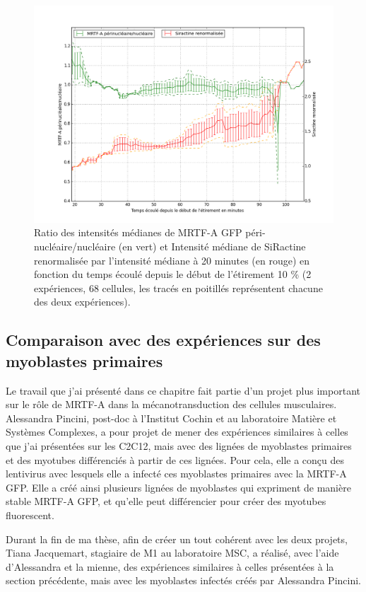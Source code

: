 \begin{figure}
\includegraphics[scale=0.4]{Figures/C2C12.png} 
\caption{Ratio des intensités médianes de MRTF-A GFP péri-nucléaire/nucléaire (en vert) et Intensité médiane de SiRactine renormalisée par l'intensité médiane à 20 minutes (en rouge)  en fonction du temps écoulé depuis le début de l'étirement 10 \% (2 expériences, 68 cellules, les tracés en poitillés représentent chacune des deux expériences).\label{Siractine_quantif}}
\end{figure}
 


\subsection{Comparaison avec des expériences sur des myoblastes primaires}

Le travail que j'ai présenté dans ce chapitre fait partie d'un projet plus important sur le rôle de MRTF-A dans la mécanotransduction des cellules musculaires. Alessandra Pincini, post-doc à l'Institut Cochin et au laboratoire Matière et Systèmes Complexes, a pour projet de mener des expériences similaires à celles que j'ai présentées sur les C2C12, mais avec des lignées de myoblastes primaires et des myotubes différenciés à partir de ces lignées. Pour cela, elle a conçu des lentivirus avec lesquels elle a infecté ces myoblastes primaires avec la MRTF-A GFP. Elle a créé ainsi plusieurs lignées de myoblastes qui expriment de manière stable MRTF-A GFP, et qu'elle peut différencier pour créer des myotubes fluorescent. 

Durant la fin de ma thèse, afin de créer un tout cohérent avec les deux projets, Tiana Jacquemart, stagiaire de M1 au laboratoire MSC, a réalisé, avec l'aide d'Alessandra et la mienne, des expériences similaires à celles présentées à la section précédente, mais avec les myoblastes infectés créés par Alessandra Pincini. 

